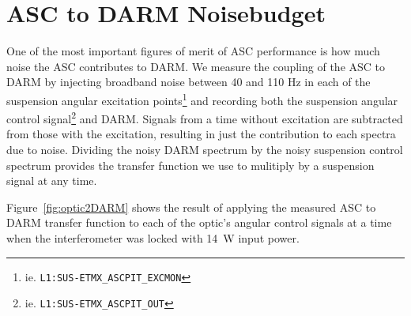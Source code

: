 



\section{ASC to DARM Noisebudget}
One of the most important figures of merit of ASC performance is how
much noise the ASC contributes to DARM. We measure the coupling of the
ASC to DARM by injecting broadband noise between 40 and 110 Hz in each
of the suspension angular excitation
points\footnote{ie. \texttt{L1:SUS-ETMX\_ASCPIT\_EXCMON}} and
recording both the suspension angular control
signal\footnote{ie. \texttt{L1:SUS-ETMX\_ASCPIT\_OUT}} and
DARM. Signals from a time without excitation are subtracted from those
with the excitation, resulting in just the contribution to each
spectra due to noise. Dividing the noisy DARM spectrum by the noisy
suspension control spectrum provides the transfer function we use to
mulitiply by a suspension signal at any time. 


Figure~\ref{fig:optic2DARM} shows the result of applying the measured
ASC to DARM transfer function to each of the optic's angular control signals at
a time when the interferometer was locked with 14~W input power.

